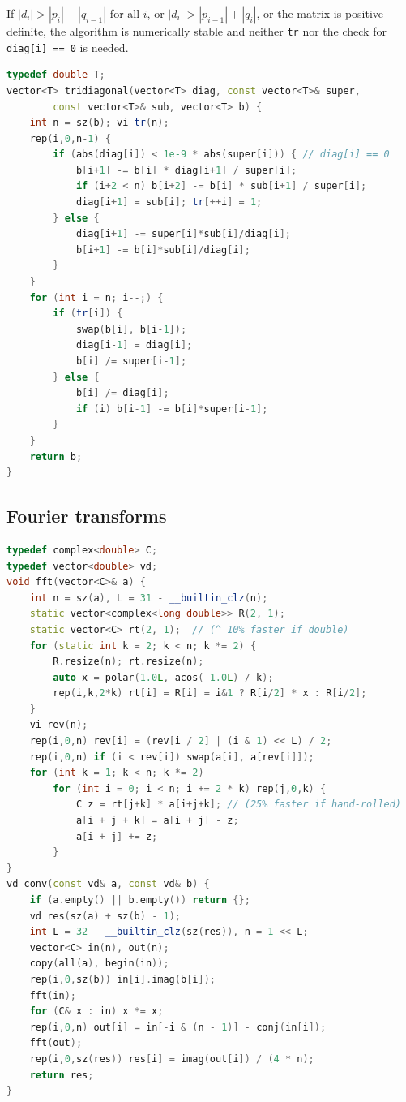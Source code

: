 \begin{multicols}{\Columns}
{If $|d_i| \ensuremath{>} |p_i| + |q_{i-1}|$ for all $i$, or $|d_i| \ensuremath{>} |p_{i-1}| + |q_i|$, or the matrix is positive definite,
the algorithm is numerically stable and neither \texttt{tr} nor the check for \texttt{diag[i] == 0} is needed.}
\begin{lstlisting}[language=C++]
typedef double T;
vector<T> tridiagonal(vector<T> diag, const vector<T>& super,
		const vector<T>& sub, vector<T> b) {
	int n = sz(b); vi tr(n);
	rep(i,0,n-1) {
		if (abs(diag[i]) < 1e-9 * abs(super[i])) { // diag[i] == 0
			b[i+1] -= b[i] * diag[i+1] / super[i];
			if (i+2 < n) b[i+2] -= b[i] * sub[i+1] / super[i];
			diag[i+1] = sub[i]; tr[++i] = 1;
		} else {
			diag[i+1] -= super[i]*sub[i]/diag[i];
			b[i+1] -= b[i]*sub[i]/diag[i];
		}
	}
	for (int i = n; i--;) {
		if (tr[i]) {
			swap(b[i], b[i-1]);
			diag[i-1] = diag[i];
			b[i] /= super[i-1];
		} else {
			b[i] /= diag[i];
			if (i) b[i-1] -= b[i]*super[i-1];
		}
	}
	return b;
}
\end{lstlisting}


\subsection{Fourier transforms}
\begin{lstlisting}[language=C++]
typedef complex<double> C;
typedef vector<double> vd;
void fft(vector<C>& a) {
	int n = sz(a), L = 31 - __builtin_clz(n);
	static vector<complex<long double>> R(2, 1);
	static vector<C> rt(2, 1);  // (^ 10% faster if double)
	for (static int k = 2; k < n; k *= 2) {
		R.resize(n); rt.resize(n);
		auto x = polar(1.0L, acos(-1.0L) / k);
		rep(i,k,2*k) rt[i] = R[i] = i&1 ? R[i/2] * x : R[i/2];
	}
	vi rev(n);
	rep(i,0,n) rev[i] = (rev[i / 2] | (i & 1) << L) / 2;
	rep(i,0,n) if (i < rev[i]) swap(a[i], a[rev[i]]);
	for (int k = 1; k < n; k *= 2)
		for (int i = 0; i < n; i += 2 * k) rep(j,0,k) {
			C z = rt[j+k] * a[i+j+k]; // (25% faster if hand-rolled)
			a[i + j + k] = a[i + j] - z;
			a[i + j] += z;
		}
}
vd conv(const vd& a, const vd& b) {
	if (a.empty() || b.empty()) return {};
	vd res(sz(a) + sz(b) - 1);
	int L = 32 - __builtin_clz(sz(res)), n = 1 << L;
	vector<C> in(n), out(n);
	copy(all(a), begin(in));
	rep(i,0,sz(b)) in[i].imag(b[i]);
	fft(in);
	for (C& x : in) x *= x;
	rep(i,0,n) out[i] = in[-i & (n - 1)] - conj(in[i]);
	fft(out);
	rep(i,0,sz(res)) res[i] = imag(out[i]) / (4 * n);
	return res;
}
\end{lstlisting}


\end{multicols}
